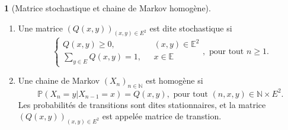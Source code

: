 \documentclass[8pt,notheorems]{beamer}
\theoremstyle{definition}
\newtheorem{definition}{\translate{Definition}}
\theoremstyle{example}
\theoremstyle{mystyle}
\theoremstyle{plain}
\begin{document}
\begin{frame}[allowframebreaks]
\begin{definition}[Matrice stochastique et chaine de Markov homogène]
\begin{enumerate}
\item Une matrice $(Q(x,y))_{(x,y)\in E^{2}}$ est dite stochastique si
$$
\begin{cases}
Q(x,y)\geq0,&\text{ }(x,y)\in\mathbb{E}^2\\
\sum_{y\in E}Q(x,y)=1,&\text{ }x\in\mathbb{E}
\end{cases},\text{ pour tout }n\geq1.
$$
\item Une chaine de Markov $(X_n)_{n\in\mathbb{N}}$ est homogène si
$$
\mathbb{P}(X_n=y|X_{n-1}=x)=Q(x,y),\text{ pour tout } (n,x,y)\in\mathbb{N}\times E^{2}.
$$
Les probabilités de transitions sont dites stationnaires, et la matrice $(Q(x,y))_{(x,y)\in E^{2}}$ est appelée matrice de transtion.
\end{enumerate}
\end{definition}
\end{frame}
\end{document}
